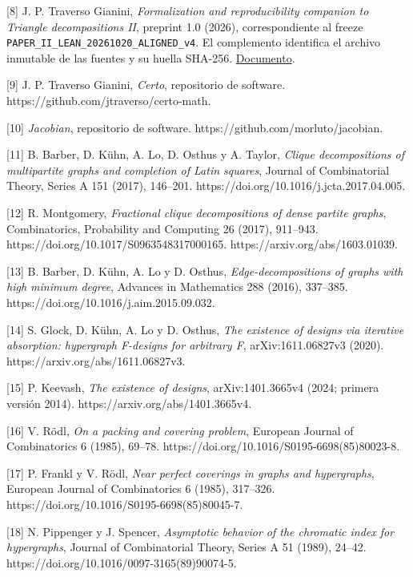 \documentclass[spanish,11pt,a4paper]{article}
\begin{document}
{[}8{]} J. P. Traverso Gianini, \emph{Formalization and reproducibility companion to Triangle decompositions II}, preprint 1.0 (2026), correspondiente al freeze \texttt{PAPER\_\allowbreak{}II\_\allowbreak{}LEA\allowbreak{}N\_\allowbreak{}20261020\_\allowbreak{}A\allowbreak{}LIGNED\_\allowbreak{}v4}. El complemento identifica el archivo inmutable de las fuentes y su huella SHA-256. \href{https://github.com/jtraverso/nash-williams-triangle-decompositions-release/blob/main/preprints/PAPER_II/05_formalization/FORMALIZATION_COMPANION_preprint_v1.0_es.md}{Documento}.

{[}9{]} J. P. Traverso Gianini, \emph{Certo}, repositorio de software. https://github.com/jtraverso/certo-math.

{[}10{]} \emph{Jacobian}, repositorio de software. https://github.com/morluto/jacobian.

{[}11{]} B. Barber, D. Kühn, A. Lo, D. Osthus y A. Taylor, \emph{Clique decompositions of multipartite graphs and completion of Latin squares}, Journal of Combinatorial Theory, Series A 151 (2017), 146--201. https://doi.org/10.1016/j.jcta.2017.04.005.

{[}12{]} R. Montgomery, \emph{Fractional clique decompositions of dense partite graphs}, Combinatorics, Probability and Computing 26 (2017), 911--943. https://doi.org/10.1017/S0963548317000165. https://arxiv.org/abs/1603.01039.

{[}13{]} B. Barber, D. Kühn, A. Lo y D. Osthus, \emph{Edge-decompositions of graphs with high minimum degree}, Advances in Mathematics 288 (2016), 337--385. https://doi.org/10.1016/j.aim.2015.09.032.

{[}14{]} S. Glock, D. Kühn, A. Lo y D. Osthus, \emph{The existence of designs via iterative absorption: hypergraph F-designs for arbitrary F}, arXiv:1611.06827v3 (2020). https://arxiv.org/abs/1611.06827v3.

{[}15{]} P. Keevash, \emph{The existence of designs}, arXiv:1401.3665v4 (2024; primera versión 2014). https://arxiv.org/abs/1401.3665v4.

{[}16{]} V. Rödl, \emph{On a packing and covering problem}, European Journal of Combinatorics 6 (1985), 69--78. https://doi.org/10.1016/S0195-6698(85)80023-8.

{[}17{]} P. Frankl y V. Rödl, \emph{Near perfect coverings in graphs and hypergraphs}, European Journal of Combinatorics 6 (1985), 317--326. https://doi.org/10.1016/S0195-6698(85)80045-7.

{[}18{]} N. Pippenger y J. Spencer, \emph{Asymptotic behavior of the chromatic index for hypergraphs}, Journal of Combinatorial Theory, Series A 51 (1989), 24--42. https://doi.org/10.1016/0097-3165(89)90074-5.
\end{document}
